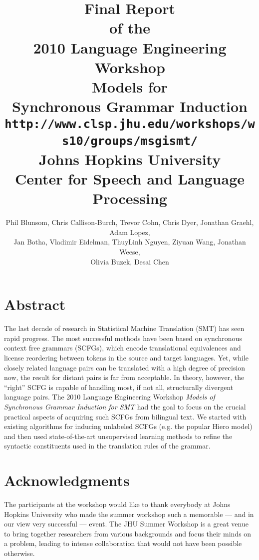 \documentclass[11pt]{report}
\renewcommand{\emph}{\it}
\theoremstyle{plain}
\begin{document}
\title{\vspace{-15mm}\LARGE {\bf Final Report}\\[2mm]
of the\\[2mm]
2010 Language Engineering Workshop\\[15mm]
{\huge \bf Models for\\
Synchronous Grammar Induction\\[2mm]
{\tt \Large http://www.clsp.jhu.edu/workshops/ws10/groups/msgismt/}\\[15mm]
Johns Hopkins University\\[2mm]
Center for Speech and Language Processing}}
\author{\large Phil Blunsom,
Chris Callison-Burch,
Trevor Cohn,
Chris Dyer,
Jonathan Graehl,
Adam Lopez,\\
\large
Jan Botha,
Vladimir Eidelman,
ThuyLinh Nguyen,
Ziyuan Wang, 
Jonathan Weese,
\\
\large Olivia Buzek, Desai Chen}
\normalsize

\maketitle

\section*{Abstract}
The last decade of research in Statistical Machine Translation (SMT) has seen rapid progress. The most successful methods have been based on synchronous context free grammars (SCFGs), which encode translational equivalences and license reordering between tokens in the source and target languages. Yet, while closely related language pairs can be translated with a high degree of precision now, the result for distant pairs is far from acceptable. In theory, however, the ``right'' SCFG is capable of handling most, if not all, structurally divergent language pairs. The 2010 Language Engineering Workshop {\emph Models of Synchronous Grammar Induction for SMT} had the goal to focus on the crucial practical aspects of acquiring such SCFGs from bilingual text. We started with existing algorithms for inducing unlabeled SCFGs (e.g. the popular Hiero model) and then used state-of-the-art unsupervised learning methods to refine the syntactic constituents used in the translation rules of the grammar.

\phantom{.}


\newpage
\section*{Acknowledgments}
The participants at the workshop would like to thank everybody at Johns Hopkins University who made the summer workshop such a memorable --- and in our view very successful --- event. The JHU Summer Workshop is a great venue to bring together researchers from various backgrounds and focus their minds on a problem, leading to intense collaboration that would not have been possible otherwise.
\end{document}
